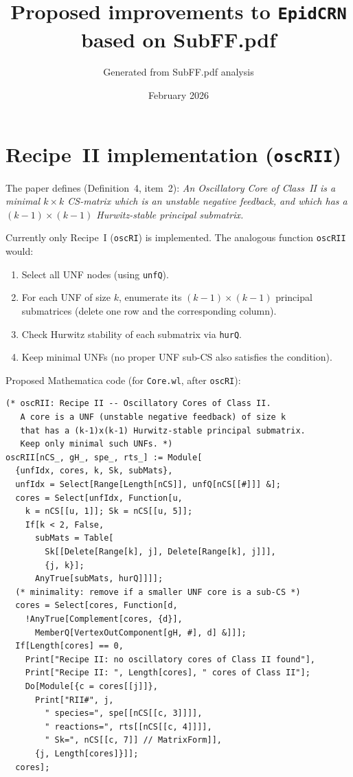 \documentclass[11pt]{article}
\title{Proposed improvements to \texttt{EpidCRN} based on SubFF.pdf}
\author{Generated from SubFF.pdf analysis}
\date{February 2026}
\begin{document}
\maketitle

\section{Recipe~II implementation (\texttt{oscRII})}

The paper defines (Definition~4, item~2): \emph{An Oscillatory Core of Class~II
is a minimal $k \times k$ CS-matrix which is an unstable negative feedback, and
which has a $(k-1) \times (k-1)$ Hurwitz-stable principal submatrix.}

Currently only Recipe~I (\texttt{oscRI}) is implemented. The analogous function
\texttt{oscRII} would:
\begin{enumerate}[nosep]
  \item Select all UNF nodes (using \texttt{unfQ}).
  \item For each UNF of size $k$, enumerate its $(k-1)\times(k-1)$ principal
        submatrices (delete one row and the corresponding column).
  \item Check Hurwitz stability of each submatrix via \texttt{hurQ}.
  \item Keep minimal UNFs (no proper UNF sub-CS also satisfies the condition).
\end{enumerate}

Proposed Mathematica code (for \texttt{Core.wl}, after \texttt{oscRI}):
\begin{verbatim}
(* oscRII: Recipe II -- Oscillatory Cores of Class II.
   A core is a UNF (unstable negative feedback) of size k
   that has a (k-1)x(k-1) Hurwitz-stable principal submatrix.
   Keep only minimal such UNFs. *)
oscRII[nCS_, gH_, spe_, rts_] := Module[
  {unfIdx, cores, k, Sk, subMats},
  unfIdx = Select[Range[Length[nCS]], unfQ[nCS[[#]]] &];
  cores = Select[unfIdx, Function[u,
    k = nCS[[u, 1]]; Sk = nCS[[u, 5]];
    If[k < 2, False,
      subMats = Table[
        Sk[[Delete[Range[k], j], Delete[Range[k], j]]],
        {j, k}];
      AnyTrue[subMats, hurQ]]]];
  (* minimality: remove if a smaller UNF core is a sub-CS *)
  cores = Select[cores, Function[d,
    !AnyTrue[Complement[cores, {d}],
      MemberQ[VertexOutComponent[gH, #], d] &]]];
  If[Length[cores] == 0,
    Print["Recipe II: no oscillatory cores of Class II found"],
    Print["Recipe II: ", Length[cores], " cores of Class II"];
    Do[Module[{c = cores[[j]]},
      Print["RII#", j,
        " species=", spe[[nCS[[c, 3]]]],
        " reactions=", rts[[nCS[[c, 4]]]],
        " Sk=", nCS[[c, 7]] // MatrixForm]],
      {j, Length[cores]}]];
  cores];
\end{verbatim}
\end{document}
